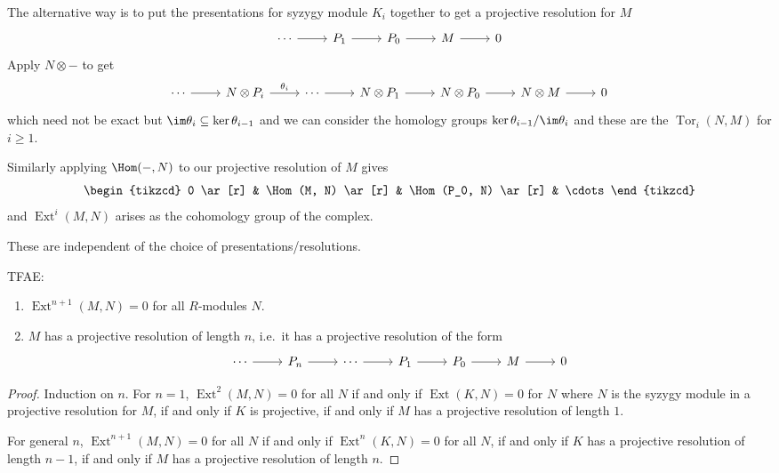 \documentclass[a4paper]{article}
\DeclareMathOperator{\Tor}{Tor}
\DeclareMathOperator{\Ext}{Ext}
\begin{document}
The alternative way is to put the presentations for syzygy module \(K_i\) together to get a projective resolution for \(M\)
\[
  \begin{tikzcd}
    \cdots \ar[r] & P_1 \ar[r] & P_0 \ar[r] & M \ar[r] & 0
  \end{tikzcd}
\]
Apply \(N \otimes -\) to get
\[
  \begin{tikzcd}
    \cdots \ar[r] & N \otimes P_i \ar[r, "\theta_i"] & \cdots \ar[r] & N \otimes P_1 \ar[r] & N \otimes P_0 \ar[r] & N \otimes M \ar[r] & 0
  \end{tikzcd}
\]
which need not be exact but \(\im \theta_i \subseteq \ker \theta_{i - 1}\) and we can consider the homology groups \(\ker \theta_{i - 1}/\im \theta_i\) and these  are the \(\Tor_i(N, M)\) for \(i \geq 1\).

Similarly applying \(\Hom(-, N)\) to our projective resolution of \(M\) gives
\[
  \begin{tikzcd}
    0 \ar[r] & \Hom(M, N) \ar[r] & \Hom(P_0, N) \ar[r] & \cdots
  \end{tikzcd}
\]
and \(\Ext^i(M, N)\) arises as the cohomology group of the complex.

\begin{remark}
  These are independent of the choice of presentations/resolutions.
\end{remark}

\begin{lemma}
  TFAE:
  \begin{enumerate}
  \item \(\Ext^{n + 1}(M, N) = 0\) for all \(R\)-modules \(N\).
  \item \(M\) has a projective resolution of length \(n\), i.e.\ it has a projective resolution of the form
    \[
      \begin{tikzcd}
        \cdots \ar[r] & P_n \ar[r] & \cdots \ar[r] & P_1 \ar[r] & P_0 \ar[r] & M \ar[r] & 0
      \end{tikzcd}
    \]
  \end{enumerate}
\end{lemma}

\begin{proof}
  Induction on \(n\). For \(n = 1\), \(\Ext^2(M, N) = 0\) for all \(N\) if and only if \(\Ext(K, N) = 0\) for \(N\) where \(N\) is the syzygy module in a projective resolution for \(M\), if and only if \(K\) is projective, if and only if \(M\) has a projective resolution of length \(1\).

  For general \(n\), \(\Ext^{n + 1}(M, N) = 0\) for all \(N\) if and only if \(\Ext^n(K, N) = 0\) for all \(N\), if and only if \(K\) has a projective resolution of length \(n - 1\), if and only if \(M\) has a projective resolution of length \(n\).
\end{proof}
\end{document}
